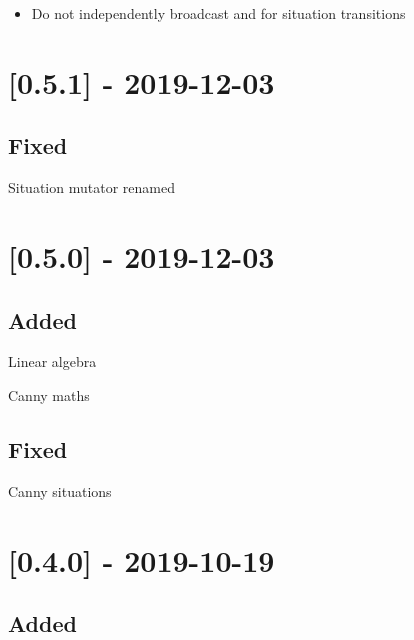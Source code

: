\begin{itemize}
    \item Do not independently broadcast  and  for situation transitions
\end{itemize}

\section{[0.5.1] - 2019-12-03}

\subsection{Fixed}

\begin{shortlist}
    \item Situation mutator renamed 
\end{shortlist}

\section{[0.5.0] - 2019-12-03}

\subsection{Added}

\begin{shortlist}
    \item Linear algebra
    \item Canny maths
\end{shortlist}

\subsection{Fixed}

\begin{shortlist}
    \item Canny situations
\end{shortlist}

\section{[0.4.0] - 2019-10-19}

\subsection{Added}

